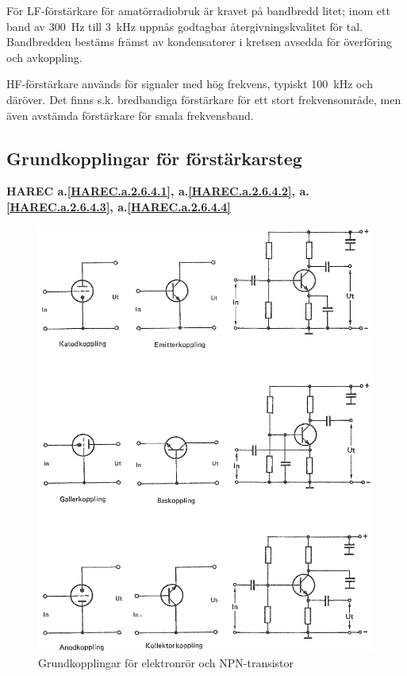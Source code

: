 För LF-förstärkare för amatörradiobruk är kravet på bandbredd litet;
inom ett band av 300~Hz till 3~kHz uppnås godtagbar
återgivningskvalitet för tal. Bandbredden bestäms främst av
kondensatorer i kretsen avsedda för överföring och avkoppling.

HF-förstärkare används för signaler med hög frekvens, typiskt 100~kHz
och däröver. Det finns s.k. bredbandiga förstärkare för ett stort
frekvensområde, men även avstämda förstärkare för smala frekvensband.

\subsection{Grundkopplingar för förstärkarsteg}
\textbf{HAREC a.\ref{HAREC.a.2.6.4.1}, a.\ref{HAREC.a.2.6.4.2}, a.\ref{HAREC.a.2.6.4.3}, a.\ref{HAREC.a.2.6.4.4}\label{myHAREC.a.2.6.4.1}\label{myHAREC.a.2.6.4.2}\label{myHAREC.a.2.6.4.3}\label{myHAREC.a.2.6.4.4}}

\begin{figure}
\includegraphics[width=\textwidth]{images/cropped_pdfs/bild_2_3-42.pdf}
\caption{Grundkopplingar för elektronrör och NPN-transistor}
\label{fig:BildII3-42}
\end{figure}

